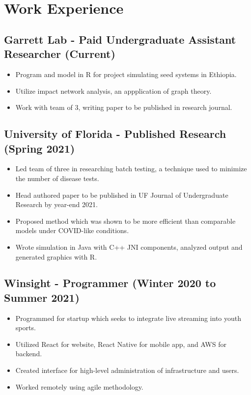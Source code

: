 \documentclass{article}
\newenvironment{CustomItemize}
{ \begin{itemize}[leftmargin=1em]
    \setlength{\itemsep}{0pt}
    \setlength{\parskip}{0pt}
    \setlength{\parindent}{0pt}
    \setlength{\parsep}{0pt}     }
{ \end{itemize}                  }
\begin{document}

\vspace{.25em}

\section{Work Experience}

\subsection{Garrett Lab - Paid Undergraduate Assistant Researcher (Current)}
\begin{CustomItemize}
\item Program and model in R for project simulating seed systems in Ethiopia.
\item Utilize impact network analysis, an appplication of graph theory.
\item Work with team of 3, writing paper to be published in research journal.
\end{CustomItemize}

\subsection{University of Florida - Published Research (Spring 2021)}
\begin{CustomItemize}
\item Led team of three in researching batch testing, a technique used to minimize the number of disease tests.
\item Head authored paper to be published in UF Journal of Undergraduate Research by year-end 2021.
\item Proposed method which was shown to be more efficient than comparable models under COVID-like conditions.
\item Wrote simulation in Java with C++ JNI components, analyzed output and generated graphics with R.
\end{CustomItemize}

\subsection{Winsight - Programmer (Winter 2020 to Summer 2021)}
\begin{CustomItemize}
\item Programmed for startup which seeks to integrate live streaming into youth sports.
\item Utilized React for website, React Native for mobile app, and AWS for backend.
\item Created interface for high-level administration of infrastructure and users.
\item Worked remotely using agile methodology.
\end{CustomItemize}
\end{document}
